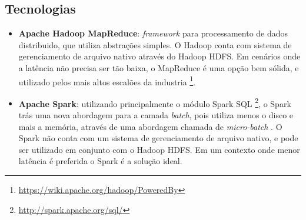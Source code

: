 \subsection{Tecnologias}

\begin{itemize}
    \item \textbf{Apache Hadoop MapReduce}: \textit{framework} para processamento
de dados distribuido, que utiliza abstrações simples. O Hadoop conta com sistema
de gerenciamento de arquivo nativo através do Hadoop HDFS. Em cenários onde a
latência não precisa ser tão baixa, o MapReduce é uma opção bem sólida, e
utilizado pelos mais altos escalões da
industria \footnote{\url{https://wiki.apache.org/hadoop/PoweredBy}}.

    \item \textbf{Apache Spark}: utilizando principalmente o módulo Spark SQL
\footnote{\url{http://spark.apache.org/sql/}}, o Spark trás uma nova abordagem
para a camada \textit{batch}, pois utiliza menos o disco e mais a memória,
através de uma abordagem chamada de \textit{micro-batch} \cite{arsalan2014}.
O Spark não conta com um sistema de gerenciamento de arquivo nativo, e pode
ser utilizado em conjunto com o Hadoop HDFS. Em um contexto onde menor latência
é preferida o Spark é a solução ideal.

\end{itemize}

